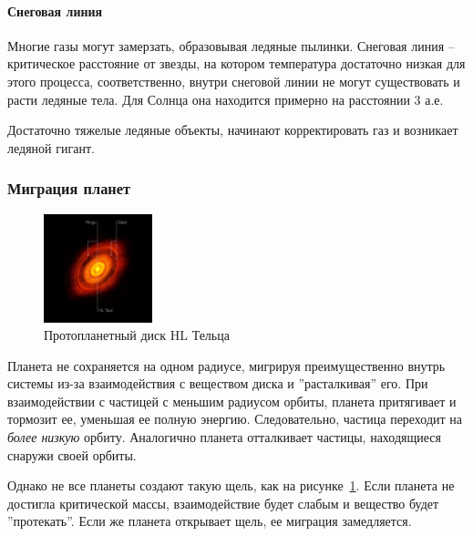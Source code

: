 \paragraph{Снеговая линия} Многие газы могут замерзать, образовывая ледяные пылинки. Снеговая линия -- критическое расстояние от звезды, на котором температура достаточно низкая для этого процесса, соответственно, внутри снеговой линии не могут существовать и расти ледяные тела. Для Солнца она находится примерно на расстоянии 3 а.е.

Достаточно тяжелые ледяные объекты, начинают корректировать газ и возникает ледяной гигант. 
\newpage
\subsubsection{Миграция планет}

\begin{figure}
  \begin{center}
    \includegraphics[width=0.28\textwidth]{Pictures/4_disk_gaps.png}
  \end{center}
  \caption{Протопланетный диск HL Тельца}
  \label{fig:4_disk}
\end{figure}Планета не сохраняется на одном радиусе, мигрируя преимущественно внутрь системы из-за взаимодействия с веществом диска и ''расталкивая'' его. 
При взаимодействии с частицей с меньшим радиусом орбиты, планета притягивает и тормозит ее, уменьшая ее полную энергию. Следовательно, частица переходит на \textit{более низкую} орбиту. Аналогично планета отталкивает частицы, находящиеся снаружи своей орбиты.

Однако не все планеты создают такую щель, как на \mbox{рисунке \ref{fig:4_disk}}. Если планета не достигла критической массы, взаимодействие будет слабым и вещество будет ''протекать''. Если же планета открывает щель, ее миграция замедляется.

